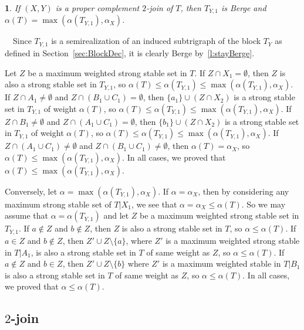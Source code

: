 \documentclass[11 pt] {article}
\newcommand\blackslug{\hbox{\hskip 1pt \vrule width 4pt height 8pt depth 1.5pt
        \hskip 1pt}}
\newcommand\bbox{\hfill \quad \blackslug \medbreak}
\newtheorem{lemma}[theorem]{}
\newcounter{claim}
\newcommand{\Proof}{\setcounter{claim}{0}\noindent{\bf Proof.}\ \ }
\begin{document}
\begin{lemma}
  \label{alphaC2J}
  If $(X, Y)$ is a proper complement $2$-join of $T$, then $T_{Y, 1}$
  is Berge and $\alpha(T) = \max (\alpha(T_{Y, 1}), \alpha_X)$.
\end{lemma}
\Proof Since $T_{Y, 1}$ is a semirealization of an induced subtrigraph of
the block $T_Y$ as defined in Section~\ref{sec:BlockDec}, it is clearly
Berge by~\ref{l:stayBerge}.

Let $Z$ be a maximum weighted strong stable set in $T$. If $Z
\cap X_1 = \emptyset$, then $Z$ is also a strong stable set in $T_{Y,
  1}$, so $\alpha(T) \leq \alpha(T_{Y, 1}) \leq \max (\alpha(T_{Y,
  1}), \alpha_X)$.  If $Z \cap A_1 \neq \emptyset$ and $Z \cap (B_1
\cup C_1) = \emptyset$, then $\{a_1\} \cup (Z\cap X_2)$ is a strong
stable set in $T_{Y, 1}$ of weight $\alpha(T)$, so $\alpha(T) \leq
\alpha(T_{Y, 1}) \leq \max (\alpha(T_{Y, 1}), \alpha_X)$.  If $Z \cap
B_1 \neq \emptyset$ and $Z \cap (A_1 \cup C_1) = \emptyset$, then
$\{b_1\} \cup (Z\cap X_2)$ is a strong stable set in $T_{Y, 1}$ of
weight $\alpha(T)$, so $\alpha(T) \leq \alpha(T_{Y, 1}) \leq \max
(\alpha(T_{Y, 1}), \alpha_X)$.  If $Z \cap (A_1 \cup C_1) \neq
\emptyset$ and $Z \cap (B_1 \cup C_1) \neq \emptyset$, then $\alpha(T)
= \alpha_X$, so $\alpha(T) \leq \max (\alpha(T_{Y, 1}), \alpha_X)$.
In all cases, we proved that $\alpha(T) \leq \max (\alpha(T_{Y, 1}),
\alpha_X)$.

Conversely, let $\alpha = \max (\alpha(T_{Y, 1}), \alpha_X)$.  If
$\alpha = \alpha_X$, then by considering any maximum strong stable set
of $T| X_1$, we see that $\alpha = \alpha_X \leq \alpha(T)$.  So we
may assume that $\alpha = \alpha(T_{Y, 1})$ and let $Z$ be a maximum
weighted strong stable set in $T_{Y, 1}$.  If $a \notin Z$ and $b
\notin Z$, then $Z$ is also a strong stable set in $T$, so $\alpha
\leq \alpha(T)$.  If $a \in Z$ and $b \notin Z$, then $Z' \cup Z
\setminus \{a\}$, where $Z'$ is a maximum weighted strong stable in
$T|A_1$, is also a strong stable set in $T$ of same weight as $Z$, so
$\alpha \leq \alpha(T)$.  If $a \notin Z$ and $b \in Z$, then $Z' \cup
Z \setminus \{b\}$ where $Z'$ is a maximum weighted stable in $T|B_1$
is also a strong stable set in $T$ of same weight as $Z$, so $\alpha
\leq \alpha(T)$.  In all cases, we proved that $\alpha \leq
\alpha(T)$.  \bbox



\subsection{$2$-join}
\label{ss:2j}
\end{document}
